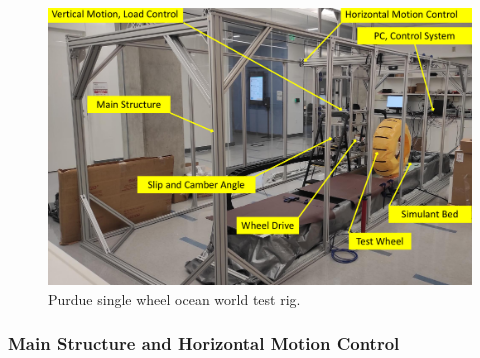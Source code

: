 \documentclass{article}
\begin{document}
\begin{figure}[hbt!]
\centering
\includegraphics[width=6.00in]{test-rig-images/overall-system-view.pdf}
\caption{Purdue single wheel ocean world test rig.}
\label{fig:overall-system-view}
\end{figure}



\subsubsection{Main Structure and Horizontal Motion Control}
\label{subsubsec:main-structure}
\end{document}
